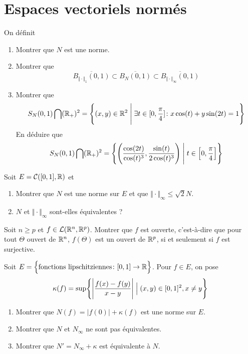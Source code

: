\section{Espaces vectoriels normés}
\begin{exercise}
	On définit 
	\begin{enumerate}
		\item Montrer que $N$ est une norme.
		\item Montrer que $$\overline{B_{\Vert\cdot\Vert_{1}}(0,1)}\subset \overline{B_{N}(0,1)}\subset\overline{B_{\Vert\cdot\Vert_{\infty}}(0,1)}$$
		\item Montrer que $$S_{N}(0,1)\bigcap(\mathbb{R}_{+})^{2}=\Biggl\{(x,y)\in\mathbb{R}^{2}\Biggm|\exists t\in[0,\frac{\pi}{4}]\colon x\cos(t)+y\sin(2t)=1\Biggr\}$$
		En déduire que $$S_{N}(0,1)\bigcap(\mathbb{R}_{+})^{2}=\Biggl\{\Biggl(\frac{\cos(2t)}{\cos(t)^{3}},\frac{\sin(t)}{2\cos(t)^{3}}\Biggr)\Biggm| t\in\Bigl[0,\frac{\pi}{4}\Bigr]\Biggr\}$$
	\end{enumerate}
\end{exercise}

\begin{exercise}
	Soit $E=\mathcal{C}([0,1],\mathbb{R})$ et 
	\begin{enumerate}
		\item Montrer que $N$ est une norme sur $E$ et que $\Vert\cdot\Vert_{\infty}\leqslant\sqrt{2}N$.
		\item $N$ et $\Vert\cdot\Vert_{\infty}$ sont-elles équivalentes ?
	\end{enumerate}
\end{exercise}

\begin{exercise}
	Soit $n\geqslant p$ et $f\in\mathcal{L}(\mathbb{R}^{n},\mathbb{R}^{p})$. Montrer que $f$ est ouverte, c'est-à-dire que pour tout $\Theta$ ouvert de $\mathbb{R}^{n}$, $f(\Theta)$ est un ouvert de $\mathbb{R}^{p}$, si et seulement si $f$ est surjective.
\end{exercise}

\begin{exercise}
	Soit $E=\Bigl\{\text{fonctions lipschitziennes}\colon [0,1]\to\mathbb{R}\Bigr\}$. Pour $f\in E$, on pose 
	$$\kappa(f)=\sup\Biggl\{\Biggl\lvert\frac{f(x)-f(y)}{x-y}\Biggr\rvert\Bigm|(x,y)\in[0,1]^{2},x\neq y\Biggr\}$$
	\begin{enumerate}
		\item Montrer que $N(f)=\vert f(0)\vert+\kappa(f)$ est une norme sur $E$.
		\item Montrer que $N$ et $N_{\infty}$ ne sont pas équivalentes.
		\item Montrer que $N'=N_{\infty}+\kappa$ est équivalente à $N$.
	\end{enumerate}
\end{exercise}

